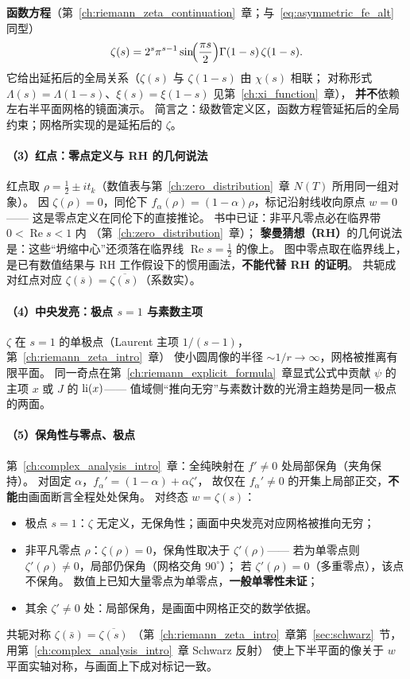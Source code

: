 \textbf{函数方程}（第~\ref{ch:riemann_zeta_continuation}~章；与~\eqref{eq:asymmetric_fe_alt} 同型）
\[
\zeta(s)=2^s\pi^{s-1}\sin\!\Bigl(\frac{\pi s}{2}\Bigr)\Gamma(1-s)\,\zeta(1-s).
\]
它给出延拓后的全局关系（$\zeta(s)$ 与 $\zeta(1-s)$ 由 $\chi(s)$ 相联；
对称形式 $\Lambda(s)=\Lambda(1-s)$、$\xi(s)=\xi(1-s)$ 见第~\ref{ch:xi_function}~章），
\textbf{并不}依赖左右半平面网格的镜面演示。
简言之：级数管定义区，函数方程管延拓后的全局约束；网格所实现的是延拓后的 $\zeta$。

\paragraph{（3）红点：零点定义与 RH 的几何说法}
红点取 $\rho=\frac12\pm it_k$（数值表与第~\ref{ch:zero_distribution}~章 $N(T)$ 所用同一组对象）。
因 $\zeta(\rho)=0$，同伦下
$f_\alpha(\rho)=(1-\alpha)\rho$，标记沿射线收向原点 $w=0$——
这是零点定义在同伦下的直接推论。
书中已证：非平凡零点必在临界带 $0<\operatorname{Re}s<1$ 内
（第~\ref{ch:zero_distribution}~章）；
\textbf{黎曼猜想（RH）}的几何说法是：这些“坍缩中心”还须落在临界线
$\operatorname{Re}s=\frac12$ 的像上。
图中零点取在临界线上，是已有数值结果与 RH 工作假设下的惯用画法，\textbf{不能代替 RH 的证明}。
共轭成对红点对应 $\zeta(\overline s)=\overline{\zeta(s)}$（系数实）。

\paragraph{（4）中央发亮：极点 $s=1$ 与素数主项}
$\zeta$ 在 $s=1$ 的单极点（Laurent 主项 $1/(s-1)$，第~\ref{ch:riemann_zeta_intro}~章）
使小圆周像的半径 $\sim 1/r\to\infty$，网格被推离有限平面。
同一奇点在第~\ref{ch:riemann_explicit_formula}~章显式公式中贡献
$\psi$ 的主项 $x$ 或 $J$ 的 $\operatorname{li}(x)$——
值域侧“推向无穷”与素数计数的光滑主趋势是同一极点的两面。

\paragraph{（5）保角性与零点、极点}
第~\ref{ch:complex_analysis_intro}~章：全纯映射在 $f'\neq 0$ 处局部保角（夹角保持）。
对固定 $\alpha$，$f_\alpha'=(1-\alpha)+\alpha\zeta'$，
故仅在 $f_\alpha'\neq 0$ 的开集上局部正交，\textbf{不能}由画面断言全程处处保角。
对终态 $w=\zeta(s)$：
\begin{itemize}
  \item 极点 $s=1$：$\zeta$ 无定义，无保角性；画面中央发亮对应网格被推向无穷；
  \item 非平凡零点 $\rho$：$\zeta(\rho)=0$，保角性取决于 $\zeta'(\rho)$——
        若为单零点则 $\zeta'(\rho)\neq 0$，局部仍保角（网格交角 $90^\circ$）；
        若 $\zeta'(\rho)=0$（多重零点），该点不保角。
        数值上已知大量零点为单零点，\textbf{一般单零性未证}；
  \item 其余 $\zeta'\neq 0$ 处：局部保角，是画面中网格正交的数学依据。
\end{itemize}
共轭对称 $\zeta(\bar s)=\overline{\zeta(s)}$
（第~\ref{ch:riemann_zeta_intro}~章第~\ref{sec:schwarz}~节，用第~\ref{ch:complex_analysis_intro}~章 Schwarz 反射）
使上下半平面的像关于 $w$ 平面实轴对称，与画面上下成对标记一致。

